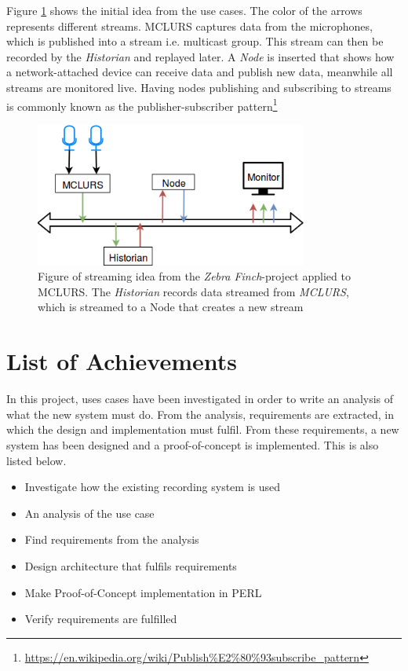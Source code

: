 \noindent Figure \ref{fig:streamingidea:idea} shows the initial idea from the use cases.
The color of the arrows represents different streams. MCLURS captures data from the microphones, which is published into a stream i.e. multicast group.
This stream can then be recorded by the \textit{Historian} and replayed later.
A \textit{Node} is inserted that shows how a network-attached device can receive data and publish new data, meanwhile all streams are monitored live. Having nodes publishing and subscribing to streams is commonly known as the publisher-subscriber pattern\footnote{\url{https://en.wikipedia.org/wiki/Publish\%E2\%80\%93subscribe_pattern}}
\begin{figure}[H]
	\centering
	\includegraphics[width=0.8\textwidth]{figures/streaming_idea_all}
	\caption{Figure of streaming idea from the \textit{Zebra Finch}-project applied to MCLURS. The \textit{Historian} records data streamed from \textit{MCLURS}, which is streamed to a Node that creates a new stream} \label{fig:streamingidea:idea}
\end{figure}

\section{List of Achievements}
In this project, uses cases have been investigated in order to write an analysis of what the new system must do. From the analysis, requirements are extracted, in which the design and implementation must fulfil. From these requirements, a new system has been designed and a proof-of-concept is implemented. This is also listed below.

\begin{itemize}
	\item Investigate how the existing recording system is used
	\item An analysis of the use case
	\item Find requirements from the analysis
	\item Design architecture that fulfils requirements
	\item Make Proof-of-Concept implementation in PERL
	\item Verify requirements are fulfilled
\end{itemize}

